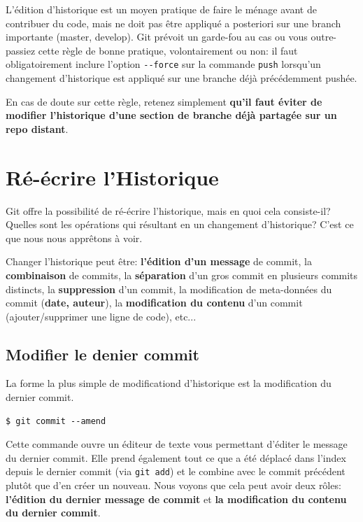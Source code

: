 \documentclass{../../common/tufte-latex/tufte-handout}
\begin{document}
L'édition d'historique est un moyen pratique de faire le ménage avant de contribuer du code, mais ne doit pas être appliqué a posteriori sur une branch importante (master, develop).  Git prévoit un garde-fou au cas ou vous outre-passiez cette règle de bonne pratique, volontairement ou non: il faut obligatoirement inclure l'option \texttt{-{}-force} sur la commande \texttt{push} lorsqu'un changement d'historique est appliqué sur une branche déjà précédemment pushée.

En cas de doute sur cette règle, retenez simplement \textbf{qu'il faut éviter de modifier l'historique d'une section de branche déjà partagée sur un repo distant}.

\section{Ré-écrire l'Historique}
Git offre la possibilité de ré-écrire l'historique, mais en quoi cela consiste-il? Quelles sont les opérations qui résultant en un changement d'historique? C'est ce que nous nous apprêtons à voir.

Changer l'historique peut être: \textbf{l'édition d'un message} de commit, la \textbf{combinaison} de commits, la \textbf{séparation} d'un gros commit en plusieurs commits distincts, la \textbf{suppression} d'un commit, la modification de meta-données du commit (\textbf{date, auteur}), la \textbf{modification du contenu} d'un commit (ajouter/supprimer une ligne de code), etc...

\subsection{Modifier le denier commit}
La forme la plus simple de modificationd d'historique est la modification du dernier commit.

\begin{lstlisting}[style=BashInputStyle]
  $ git commit --amend
\end{lstlisting}

Cette commande ouvre un éditeur de texte vous permettant d'éditer le message du dernier commit.
Elle prend également tout ce que a été déplacé dans l'index depuis le dernier commit (via \texttt{git add}) et le combine avec le commit précédent plutôt que d'en créer un nouveau.
Nous voyons que cela peut avoir deux rôles: \textbf{l'édition du dernier message de commit} et \textbf{la modification du contenu du dernier commit}.
\end{document}
